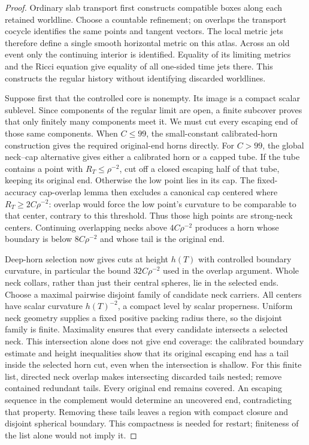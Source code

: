 \begin{proof}
Ordinary slab transport first constructs compatible boxes along each
retained worldline.  Choose a countable refinement; on overlaps the
transport cocycle identifies the same points and tangent vectors.
The local metric jets therefore define a single smooth horizontal
metric on this atlas.  Across an old event only the continuing interior
is identified.  Equality of its limiting metrics and the Ricci equation
give equality of all one-sided time jets there.  This constructs the
regular history without identifying discarded worldlines.

Suppose first that the controlled core is nonempty.  Its image is a
compact scalar sublevel.  Since components of the regular limit are
open, a finite subcover proves that only finitely many components meet
it.  We must cut every escaping end of those same components.  When
$C\leq99$, the small-constant calibrated-horn construction gives the
required original-end horns directly.  For $C>99$, the global
neck--cap alternative gives either a calibrated horn or a capped tube.
If the tube contains a point with $R_T\leq\rho^{-2}$, cut off a
closed escaping half of that tube, keeping its original end.
Otherwise the low point lies in its cap.  The fixed-accuracy cap-overlap
lemma then excludes a canonical cap centered where
$R_T\geq2C\rho^{-2}$: overlap would force the low point's curvature
to be comparable to that center, contrary to this threshold.
Thus those high points are strong-neck centers.  Continuing overlapping
necks above $4C\rho^{-2}$ produces a horn whose boundary is below
$8C\rho^{-2}$ and whose tail is the original end.

Deep-horn selection now gives cuts at height $h(T)$ with controlled
boundary curvature, in particular the bound $32C\rho^{-2}$ used in
the overlap argument.  Whole neck collars, rather than just their
central spheres, lie in the selected ends.  Choose a maximal pairwise
disjoint family of candidate neck carriers.  All centers have scalar
curvature $h(T)^{-2}$, a compact level by scalar properness.  Uniform
neck geometry supplies a fixed positive packing radius there, so the
disjoint family is finite.  Maximality ensures that every candidate
intersects a selected neck.  This intersection alone does not give
end coverage: the calibrated boundary estimate and height inequalities
show that its original escaping end has a tail inside the selected
horn cut, even when the intersection is shallow.  For this finite
list, directed neck overlap makes intersecting discarded tails nested;
remove contained redundant tails.  Every original end remains covered.
An escaping sequence in the complement would determine an uncovered
end, contradicting that property.  Removing these
tails leaves a region with compact closure and disjoint spherical
boundary.  This compactness is needed for restart; finiteness of the
list alone would not imply it.


\end{proof}
